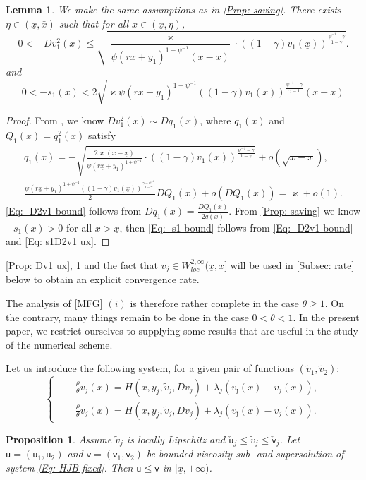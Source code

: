 \documentclass[11pt]{article}
\numberwithin{equation}{section}
\numberwithin{algorithm}{section}
\newtheorem{lemma}[lemma]{Lemma}
\newtheorem{proposition}[proposition]{Proposition}
\newcommand{\lc}{\left(}
\newcommand{\rc}{\right)}
\def\su{{\mathsf{u}}}
\def\sv{{\mathsf{v}}}
\newcommand{\ux}{{\underline x}}
\newcommand{\beq}{\begin{equation}}
\newcommand{\eeq}{\end{equation}}
\newcommand{\g}{\gamma}
\newcommand{\p}{\psi}
\theoremstyle{plain}
\begin{document}
\begin{lemma}\label{Prop: D2v1 ux}
We make the same assumptions as in \cref{Prop: saving}. There exists $\eta\in (\ux,\bar{x})$ such that for all $x\in (\ux,\eta)$, 
\beq\label{Eq: -D2v1 bound}
0<-Dv^2_1(x)\leq \sqrt{\frac{\varkappa}{\p \lc r\ux+y_1\rc^{1+\p^{-1}}(x-\ux)}\cdot ((1-\g)v_1(\ux))^{\frac{\p^{-1}-\g}{1-\g}}}.
\eeq
and 
\beq\label{Eq: -s1 bound}
0<-s_1(x)<2\sqrt{\varkappa \p \lc r\ux+y_1\rc^{1+\p^{-1}}((1-\g)v_1(\ux))^{\frac{\p^{-1}-\g}{\g-1}}(x-\ux)}
\eeq

\end{lemma}
\begin{proof}
From \cite[Appendix C]{Achdou:2026aa}, we know $Dv^2_1(x)\sim Dq_1(x)$, where $q_1(x)$ and $Q_1(x)=q_1^2(x)$ satisfy
$$
\begin{aligned}
q_1(x)=-\sqrt{\frac{2\varkappa(x-\ux)}{\p \lc r\ux+y_1\rc^{1+\p^{-1}}}\cdot ((1-\g)v_1(\ux))^{\frac{\p^{-1}-\g}{1-\g}}}+o(\sqrt{x-\ux}),\\
\frac{\p \lc r\ux+y_1\rc^{1+\p^{-1}}((1-\g)v_1(\ux))^{\frac{\g-\p^{-1}}{1-\g}}}{2}DQ_1(x)+o(DQ_1(x))=\varkappa+o(1).
\end{aligned}
$$
\cref{Eq: -D2v1 bound} follows from $Dq_1(x)=\frac{DQ_1(x)}{2q(x)}$. From \cref{Prop: saving} we know $-s_1(x)>0$ for all $x>\ux$, then \cref{Eq: -s1 bound} follows from \cref{Eq: -D2v1 bound} and \cref{Eq: s1D2v1 ux}. 
\end{proof}
\cref{Prop: Dv1 ux}, \cref{Prop: D2v1 ux} and the fact that $v_j\in W^{2,\infty}_{loc}(\ux,\bar{x}]$ will be used in \cref{Subsec: rate} below to obtain an explicit convergence rate.\par
The analysis of \cref{MFG} $(i)$  is therefore rather complete in the case $\theta\geq 1$. On the contrary, many things remain to be done in the case $0<\theta<1$. In the present paper, we restrict ourselves to supplying some results that are useful in the study of the numerical scheme.\par
Let us introduce the following system, for a given pair of functions $\left(\widetilde{v}_1,\widetilde{v}_2\right)$: 
\beq\label{Eq: HJB fixed}
\left\{
      \begin{aligned}
\quad &\frac{\rho}{\theta} v_j(x)=H(x,y_j,\widetilde{v}_j,Dv_j)+\lambda_j(v_{\bar \jmath}(x)-v_j(x)),\\
&\frac{\rho}{\theta} v_j(x)=H(x,y_j,\widetilde{v}_j,Dv_j)+\lambda_j(v_{\bar \jmath}(x)-v_j(x)).
     \end{aligned}
   \right.
\eeq
\begin{proposition}\label{Prop: comparison fixed}
Assume $\widetilde{v}_j$ is locally Lipschitz and $\check{\su}_j\leq \widetilde{v}_j\leq \check{\sv}_j$. Let $\mathsf{u}=(\mathsf{u}_1,\mathsf{u}_2)$ and $\mathsf{v}=(\mathsf{v}_1,\mathsf{v}_2)$ be bounded viscosity sub- and supersolution of system \cref{Eq: HJB fixed}. Then $\mathsf{u}\leq \mathsf{v}$ in $[\ux,+\infty)$.
\end{proposition}
\end{document}
